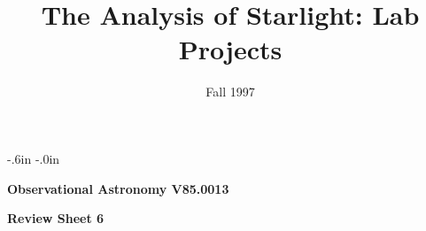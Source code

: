  
\topmargin -.6in 
\textheight 8.7in 
\oddsidemargin -.0in 
\textwidth 6.5in 
\title{The Analysis of Starlight: Lab Projects} 
\date{Fall 1997} 
 
\setcounter{page}{1} 
\setcounter{equation}{0} 
\pagestyle{empty} 
\parindent 0pt 
\parskip 8pt 
\def\arcsec{\ifmmode {^{\scriptscriptstyle\prime\prime}}
          \else $^{\scriptscriptstyle\prime\prime}$\fi}
\def\arcmin{\ifmmode {^{\scriptscriptstyle\prime}}
          \else $^{\scriptscriptstyle\prime}$\fi}
\def\deg{\ifmmode^\circ\else$^\circ$\fi}


   
 
\noindent 
{\bf Observational Astronomy      \hfill  V85.0013}\\ 
 
\bigskip 
 
\bigskip 
 
\noindent 
{\hfill \Large {\bf Review Sheet 6} \hfill} 
 
\bigskip 
 
